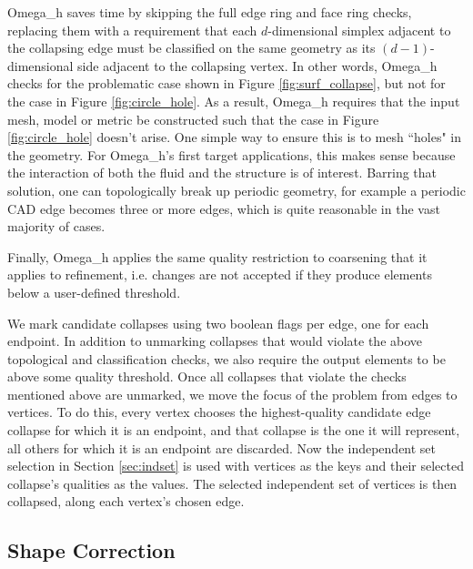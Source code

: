 Omega\_h saves time by skipping the full edge ring and face
ring checks, replacing them with a requirement that each $d$-dimensional simplex
adjacent to the collapsing edge must be classified on the same geometry
as its $(d-1)$-dimensional side adjacent to the collapsing vertex.
In other words, Omega\_h checks for the problematic case shown in Figure
\ref{fig:surf_collapse}, but not for the case in Figure \ref{fig:circle_hole}.
As a result, Omega\_h requires that the input mesh, model or metric be
constructed such that the case in Figure \ref{fig:circle_hole} doesn't arise.
One simple way to ensure this is to mesh ``holes" in the geometry.
For Omega\_h's first target applications,
this makes sense because the interaction of both the fluid and the structure
is of interest.
Barring that solution, one can topologically break up periodic geometry,
for example a periodic CAD edge becomes three or more edges,
which is quite reasonable in the vast majority of cases.

Finally, Omega\_h applies the same quality restriction to coarsening
that it applies to refinement, i.e. changes are not accepted if they produce elements
below a user-defined threshold.

We mark candidate collapses using two boolean flags per edge, one for each
endpoint.
In addition to unmarking collapses that would violate the above topological
and classification checks, we also require the output elements to be
above some quality threshold.
Once all collapses that violate the checks mentioned above are unmarked,
we move the focus of the problem from edges to vertices.
To do this, every vertex chooses the highest-quality candidate edge collapse
for which it is an endpoint, and that collapse is the one it will
represent, all others for which it is an endpoint are discarded.
Now the independent set selection in Section \ref{sec:indset} is used
with vertices as the keys and their selected collapse's qualities as the
values.
The selected independent set of vertices is then collapsed, along each
vertex's chosen edge.

\subsection{Shape Correction}
\label{sec:osh_shape}

